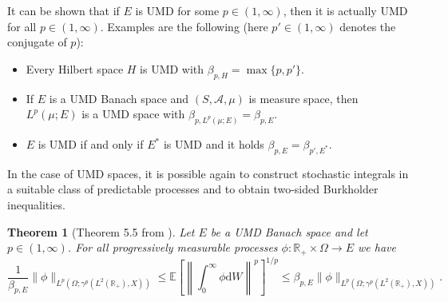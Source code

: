 \documentclass[10pt]{article}
\newcommand{\mathd}{\mathrm{d}}
\newtheorem{theorem}{Theorem}
\begin{document}
It can be shown that if $E$ is UMD for some $p \in (1, \infty)$, then it is
actually UMD for all $p \in (1, \infty)$. Examples are the following (here $p'
\in (1, \infty)$ denotes the conjugate of $p$):
\begin{itemize}
  \item Every Hilbert space $H$ is UMD with $\beta_{p, H} = \max \{ p, p' \}$.
  
  \item If $E$ is a UMD Banach space and $(S, \mathcal{A}, \mu)$ is measure
  space, then $L^p (\mu ; E)$ is a UMD space with $\beta_{p, L^p (\mu ; E)} =
  \beta_{p, E}$.
  
  \item $E$ is UMD if and only if $E^{\ast}$ is UMD and it holds $\beta_{p, E}
  = \beta_{p', E^{\ast}}$.
\end{itemize}
In the case of UMD spaces, it is possible again to construct stochastic
integrals in a suitable class of predictable processes and to obtain two-sided
Burkholder inequalities.

\begin{theorem}[Theorem 5.5 from {\cite{vanneerven2015}}]
  \label{appendixA3 burkholder UMD}Let $E$ be a UMD Banach space and let $p
  \in (1, \infty)$. For all progressively measurable processes $\phi :
  \mathbb{R}_+ \times \Omega \rightarrow E$ we have
  \[ \frac{1}{\beta_{p, E}} \| \phi \|_{L^p (\Omega ; \gamma^p (L^2
     (\mathbb{R}_+), X))} \leqslant \mathbb{E} \left[ \left\| \int_0^{\infty}
     \phi \mathd W \right\|^p \right]^{1 / p} \leqslant \beta_{p, E} \| \phi
     \|_{L^p (\Omega ; \gamma^p (L^2 (\mathbb{R}_+), X))} . \]
\end{theorem}
\end{document}
